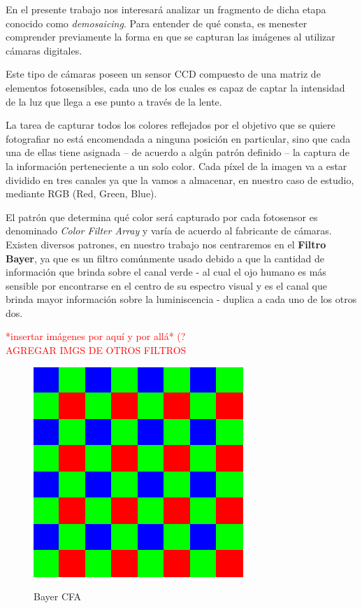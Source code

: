 \documentclass[a4paper]{article}
\begin{document}
En el presente trabajo nos interesará analizar un fragmento de dicha etapa conocido como \emph{demosaicing}. Para entender de qué consta, es menester comprender previamente la forma en que se capturan las imágenes al utilizar cámaras digitales.

Este tipo de cámaras poseen un sensor CCD compuesto de una matriz de elementos fotosensibles, cada uno de los cuales es capaz de captar la intensidad de la luz que llega a ese punto a través de la lente. 

La tarea de capturar todos los colores reflejados por el objetivo que se quiere fotografiar no está encomendada a ninguna posición en particular, sino que cada una de ellas tiene asignada – de acuerdo a algún patrón definido  – la captura de la información perteneciente a un solo color. Cada p\'ixel de la imagen va a estar dividido en tres canales ya que la vamos a almacenar, en nuestro caso de estudio, mediante RGB (Red, Green, Blue).

El patr\'on que determina qué color será capturado por cada fotosensor es denominado \emph{Color Filter Array} y var\'ia de acuerdo al fabricante de c\'amaras. Existen diversos patrones, en nuestro trabajo nos centraremos en el \textbf{Filtro Bayer}, ya que es un filtro com\'unmente usado debido a que la cantidad de informaci\'on que brinda sobre el canal verde - al cual el ojo humano es más sensible por encontrarse en el centro de su espectro visual y es el canal que brinda mayor informaci\'on sobre la luminiscencia -  duplica a cada uno de los otros dos.

\textcolor{red}{*insertar imágenes por aquí y por allá* (?\\
AGREGAR IMGS DE OTROS FILTROS
}

\begin{figure}[h!]
	\caption{Bayer CFA}
	\begin{center}
	\includegraphics[scale=0.36]{imagenes/BayerFilter}
	\label{Bayer}
  \end{center}
\end{figure}
\end{document}
